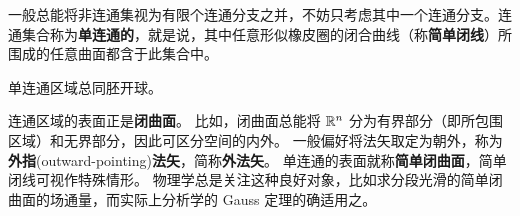 一般总能将非连通集视为有限个连通分支之并，不妨只考虑其中一个连通分支。连通集合称为\textbf{单连通的}，就是说，其中任意形似橡皮圈的闭合曲线（称\textbf{简单闭线}）所围成的任意曲面都含于此集合中。

单连通区域总同胚开球。


连通区域的表面正是\textbf{闭曲面}。
比如，闭曲面总能将 $\mathbb{R}^n$ 分为有界部分（即所包围区域）和无界部分，因此可区分空间的内外。
一般偏好将法矢取定为朝外，称为\textbf{外指}(outward-pointing)\textbf{法矢}，简称\textbf{外法矢}。
单连通的表面就称\textbf{简单闭曲面}，简单闭线可视作特殊情形。
物理学总是关注这种良好对象，比如求分段光滑的简单闭曲面的场通量，而实际上分析学的 Gauss 定理的确适用之。
